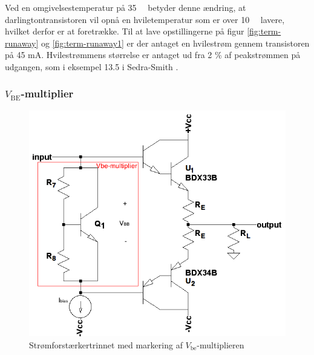 Ved en omgivelsestemperatur på 35~\celsius~ betyder denne ændring, at darlingtontransistoren vil opnå en hviletemperatur som er over 10~\celsius~ lavere, hvilket derfor er at foretrække. Til at lave opstillingerne på figur \ref{fig:term-runaway} og \ref{fig:term-runaway1} er der antaget en hvilestrøm gennem transistoren på 45 mA. Hvilestrømmens størrelse er antaget ud fra 2 \% af peakstrømmen på udgangen, som i eksempel 13.5 i Sedra-Smith \cite{sedra-smith}.%


\subsubsection*{$V_\mathrm{BE}$-multiplier}

\begin{figure}[h]
\centering
\includegraphics[scale=.4]{teknisk/effektforstaerker/vbemultiplieropbygning.png}
\caption{Strømforstærkertrinnet med markering af $V_\mathrm{be}$-multiplieren}
\label{fig:vbemulti}
\end{figure}


